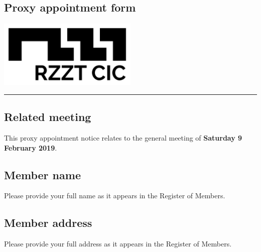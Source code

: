 \documentclass[a4paper,10pt]{article}
\begin{document}
\thispagestyle{firstpage}

\begin{Form}

\begin{minipage}[b]{0.5\textwidth}
  \section{Proxy appointment form}
\end{minipage}
%
\begin{minipage}[b]{0.5\textwidth}
  \raggedleft
  \includegraphics[width=0.5\textwidth]{logo-black.jpg}
\end{minipage}

\hrule

\vspace{2em}

\subsection{Related meeting}

This proxy appointment notice relates to the general meeting of \textbf{Saturday 9 February 2019}.

\subsection{Member name}

Please provide your full name as it appears in the Register of Members.

\begin{framed}%
  \TextField[width=\textwidth,maxlen=75,donotscroll=true,name=forename]{ }%
\end{framed}%

\subsection{Member address}

Please provide your full address as it appears in the Register of Members.

\begin{framed}%
  \TextField[width=\textwidth,donotscroll=true,multiline=true,name=address]{ }%
\end{framed}%


\end{Form}
\end{document}
